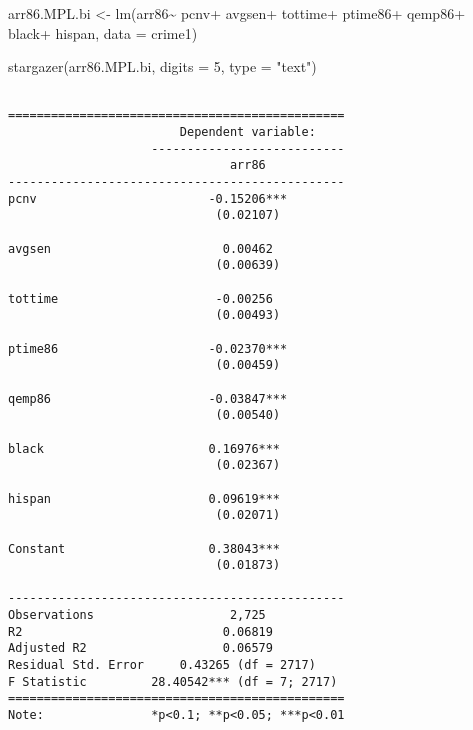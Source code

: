 \documentclass[
  letterpaper,
  DIV=11,
  numbers=noendperiod]{scrreprt}
\newenvironment{Shaded}{\begin{snugshade}}{\end{snugshade}}
\newcommand{\AttributeTok}[1]{\textcolor[rgb]{0.40,0.45,0.13}{#1}}
\newcommand{\DecValTok}[1]{\textcolor[rgb]{0.68,0.00,0.00}{#1}}
\newcommand{\FunctionTok}[1]{\textcolor[rgb]{0.28,0.35,0.67}{#1}}
\newcommand{\NormalTok}[1]{\textcolor[rgb]{0.00,0.23,0.31}{#1}}
\newcommand{\OtherTok}[1]{\textcolor[rgb]{0.00,0.23,0.31}{#1}}
\newcommand{\SpecialCharTok}[1]{\textcolor[rgb]{0.37,0.37,0.37}{#1}}
\newcommand{\StringTok}[1]{\textcolor[rgb]{0.13,0.47,0.30}{#1}}
\begin{document}
\begin{Shaded}
\begin{Highlighting}[]
\NormalTok{arr86.MPL.bi }\OtherTok{\textless{}{-}} \FunctionTok{lm}\NormalTok{(arr86}\SpecialCharTok{\textasciitilde{}}
\NormalTok{                  pcnv}\SpecialCharTok{+}
\NormalTok{                  avgsen}\SpecialCharTok{+}
\NormalTok{                  tottime}\SpecialCharTok{+}
\NormalTok{                  ptime86}\SpecialCharTok{+}
\NormalTok{                  qemp86}\SpecialCharTok{+}
\NormalTok{                    black}\SpecialCharTok{+}
\NormalTok{                    hispan,}
                \AttributeTok{data =}\NormalTok{ crime1)}

\FunctionTok{stargazer}\NormalTok{(arr86.MPL.bi, }
          \AttributeTok{digits =} \DecValTok{5}\NormalTok{,}
          \AttributeTok{type =} \StringTok{"text"}\NormalTok{)}
\end{Highlighting}
\end{Shaded}

\begin{verbatim}

===============================================
                        Dependent variable:    
                    ---------------------------
                               arr86           
-----------------------------------------------
pcnv                        -0.15206***        
                             (0.02107)         
                                               
avgsen                        0.00462          
                             (0.00639)         
                                               
tottime                      -0.00256          
                             (0.00493)         
                                               
ptime86                     -0.02370***        
                             (0.00459)         
                                               
qemp86                      -0.03847***        
                             (0.00540)         
                                               
black                       0.16976***         
                             (0.02367)         
                                               
hispan                      0.09619***         
                             (0.02071)         
                                               
Constant                    0.38043***         
                             (0.01873)         
                                               
-----------------------------------------------
Observations                   2,725           
R2                            0.06819          
Adjusted R2                   0.06579          
Residual Std. Error     0.43265 (df = 2717)    
F Statistic         28.40542*** (df = 7; 2717) 
===============================================
Note:               *p<0.1; **p<0.05; ***p<0.01
\end{verbatim}
\end{document}
